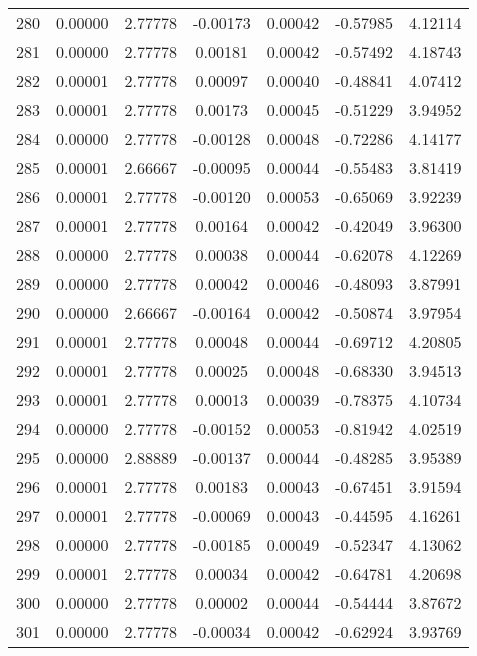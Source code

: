 \begin{longtable}{c c c c c c c}
280 &  0.00000 &      2.77778 & -0.00173 &   0.00042 &  -0.57985 &   4.12114 \\
281 &  0.00000 &      2.77778 &  0.00181 &   0.00042 &  -0.57492 &   4.18743 \\
282 &  0.00001 &      2.77778 &  0.00097 &   0.00040 &  -0.48841 &   4.07412 \\
283 &  0.00001 &      2.77778 &  0.00173 &   0.00045 &  -0.51229 &   3.94952 \\
284 &  0.00000 &      2.77778 & -0.00128 &   0.00048 &  -0.72286 &   4.14177 \\
285 &  0.00001 &      2.66667 & -0.00095 &   0.00044 &  -0.55483 &   3.81419 \\
286 &  0.00001 &      2.77778 & -0.00120 &   0.00053 &  -0.65069 &   3.92239 \\
287 &  0.00001 &      2.77778 &  0.00164 &   0.00042 &  -0.42049 &   3.96300 \\
288 &  0.00000 &      2.77778 &  0.00038 &   0.00044 &  -0.62078 &   4.12269 \\
289 &  0.00000 &      2.77778 &  0.00042 &   0.00046 &  -0.48093 &   3.87991 \\
290 &  0.00000 &      2.66667 & -0.00164 &   0.00042 &  -0.50874 &   3.97954 \\
291 &  0.00001 &      2.77778 &  0.00048 &   0.00044 &  -0.69712 &   4.20805 \\
292 &  0.00001 &      2.77778 &  0.00025 &   0.00048 &  -0.68330 &   3.94513 \\
293 &  0.00001 &      2.77778 &  0.00013 &   0.00039 &  -0.78375 &   4.10734 \\
294 &  0.00000 &      2.77778 & -0.00152 &   0.00053 &  -0.81942 &   4.02519 \\
295 &  0.00000 &      2.88889 & -0.00137 &   0.00044 &  -0.48285 &   3.95389 \\
296 &  0.00001 &      2.77778 &  0.00183 &   0.00043 &  -0.67451 &   3.91594 \\
297 &  0.00001 &      2.77778 & -0.00069 &   0.00043 &  -0.44595 &   4.16261 \\
298 &  0.00000 &      2.77778 & -0.00185 &   0.00049 &  -0.52347 &   4.13062 \\
299 &  0.00001 &      2.77778 &  0.00034 &   0.00042 &  -0.64781 &   4.20698 \\
300 &  0.00000 &      2.77778 &  0.00002 &   0.00044 &  -0.54444 &   3.87672 \\
301 &  0.00000 &      2.77778 & -0.00034 &   0.00042 &  -0.62924 &   3.93769 \\

\end{longtable}
